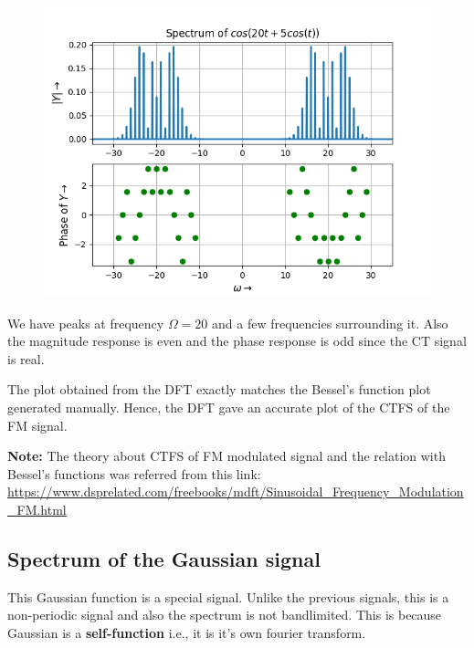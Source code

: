 \documentclass[12pt, a4paper]{article}
\begin{document}
\vspace*{-0.5cm}
\begin{figure}[H]
    \centering
    \includegraphics[scale = 0.8]{Figure_8.png}
    \label{fig:sample}
\end{figure}
\begin{center}
    We have peaks at frequency $\Omega = 20 $ and a few frequencies surrounding it. Also the magnitude response is even and the phase response is odd since the CT signal is real.
\end{center}
The plot obtained from the DFT exactly matches the Bessel's function plot generated manually. Hence, the DFT gave an accurate plot of the CTFS of the FM signal.

\textbf{Note:} The theory about CTFS of FM modulated signal and the relation with Bessel's functions was referred from this link: \url{https://www.dsprelated.com/freebooks/mdft/Sinusoidal_Frequency_Modulation_FM.html} 
\subsection{Spectrum of the Gaussian signal}
This Gaussian function is a special signal. Unlike the previous signals, this is a non-periodic signal and also the spectrum is not bandlimited. This is because Gaussian is a \textbf{self-function} i.e., it is it's own fourier transform.
\end{document}

